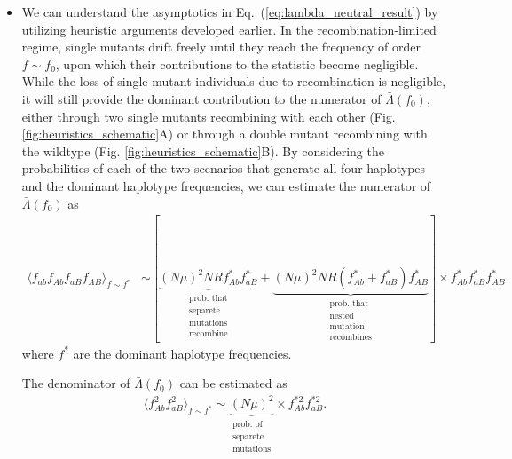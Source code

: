 \documentclass[aps,rmp,twocolumn,groupedaddress,floatfix,notitlepage]{revtex4-1}
\begin{document}
\begin{itemize}
\item We can understand the asymptotics in Eq.~(\ref{eq:lambda_neutral_result}) by utilizing heuristic arguments developed earlier. In the recombination-limited regime, single mutants drift freely until they reach the frequency of order $f \sim f_0$, upon which their contributions to the statistic become negligible. 
While the loss of single mutant individuals due to recombination is negligible, it will still provide the dominant contribution to the numerator of $\bar{\Lambda}(f_0)$, either through two single mutants recombining with each other (Fig. \ref{fig:heuristics_schematic}A) or through a double mutant recombining with the wildtype (Fig. \ref{fig:heuristics_schematic}B). %
By considering the probabilities of each of the two scenarios that generate all four haplotypes and the dominant haplotype frequencies, we can estimate the numerator of $\bar{\Lambda}(f_0)$ as
\begin{align}
    \langle f_{ab} f_{Ab} f_{aB} f_{AB}\rangle_{f \sim f^*} &\sim 
    [\underbrace{(N\mu)^2 NR f^*_{Ab}f^*_{aB}}_{\substack{\text{prob. that}\\\text{separete}\\ \text{mutations}\\ \text{recombine}}} + \underbrace{(N\mu)^2 NR (f^*_{Ab} + f^*_{aB})f^*_{AB}}_{\substack{\text{prob. that}\\\text{nested}\\ \text{mutation}\\ \text{recombines}}}] \times f^*_{Ab} f^*_{aB} f^*_{AB}
\end{align}
where $f^*$ are the dominant haplotype frequencies. 

The denominator of $\bar{\Lambda}(f_0)$ can be estimated as
\begin{align}
    \langle f_{Ab}^2 f_{aB}^2 \rangle_{f \sim f^*} \sim \underbrace{(N\mu)^2}_{\substack{\text{prob. of}\\\text{separete}\\ \text{mutations}}} 
    \times f_{Ab}^{*2} f_{aB}^{*2}. 
\end{align}


\end{itemize}
\end{document}
